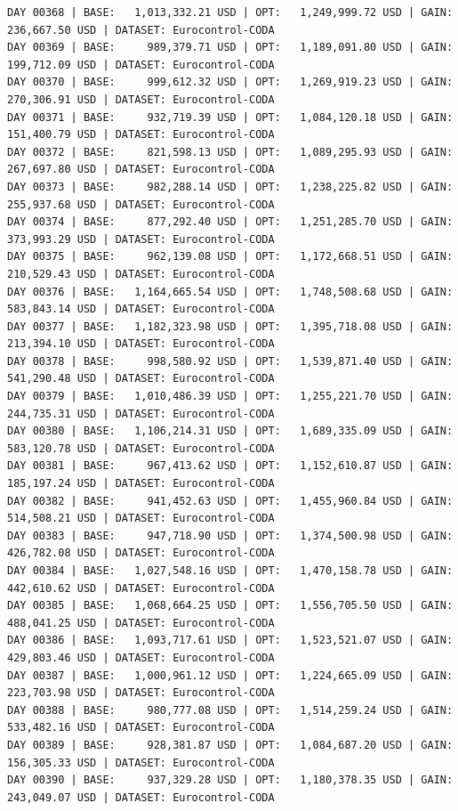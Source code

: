 \documentclass[11pt,a4paper]{article}
\begin{document}
\begin{verbatim}
DAY 00368 | BASE:   1,013,332.21 USD | OPT:   1,249,999.72 USD | GAIN: 236,667.50 USD | DATASET: Eurocontrol-CODA
DAY 00369 | BASE:     989,379.71 USD | OPT:   1,189,091.80 USD | GAIN: 199,712.09 USD | DATASET: Eurocontrol-CODA
DAY 00370 | BASE:     999,612.32 USD | OPT:   1,269,919.23 USD | GAIN: 270,306.91 USD | DATASET: Eurocontrol-CODA
DAY 00371 | BASE:     932,719.39 USD | OPT:   1,084,120.18 USD | GAIN: 151,400.79 USD | DATASET: Eurocontrol-CODA
DAY 00372 | BASE:     821,598.13 USD | OPT:   1,089,295.93 USD | GAIN: 267,697.80 USD | DATASET: Eurocontrol-CODA
DAY 00373 | BASE:     982,288.14 USD | OPT:   1,238,225.82 USD | GAIN: 255,937.68 USD | DATASET: Eurocontrol-CODA
DAY 00374 | BASE:     877,292.40 USD | OPT:   1,251,285.70 USD | GAIN: 373,993.29 USD | DATASET: Eurocontrol-CODA
DAY 00375 | BASE:     962,139.08 USD | OPT:   1,172,668.51 USD | GAIN: 210,529.43 USD | DATASET: Eurocontrol-CODA
DAY 00376 | BASE:   1,164,665.54 USD | OPT:   1,748,508.68 USD | GAIN: 583,843.14 USD | DATASET: Eurocontrol-CODA
DAY 00377 | BASE:   1,182,323.98 USD | OPT:   1,395,718.08 USD | GAIN: 213,394.10 USD | DATASET: Eurocontrol-CODA
DAY 00378 | BASE:     998,580.92 USD | OPT:   1,539,871.40 USD | GAIN: 541,290.48 USD | DATASET: Eurocontrol-CODA
DAY 00379 | BASE:   1,010,486.39 USD | OPT:   1,255,221.70 USD | GAIN: 244,735.31 USD | DATASET: Eurocontrol-CODA
DAY 00380 | BASE:   1,106,214.31 USD | OPT:   1,689,335.09 USD | GAIN: 583,120.78 USD | DATASET: Eurocontrol-CODA
DAY 00381 | BASE:     967,413.62 USD | OPT:   1,152,610.87 USD | GAIN: 185,197.24 USD | DATASET: Eurocontrol-CODA
DAY 00382 | BASE:     941,452.63 USD | OPT:   1,455,960.84 USD | GAIN: 514,508.21 USD | DATASET: Eurocontrol-CODA
DAY 00383 | BASE:     947,718.90 USD | OPT:   1,374,500.98 USD | GAIN: 426,782.08 USD | DATASET: Eurocontrol-CODA
DAY 00384 | BASE:   1,027,548.16 USD | OPT:   1,470,158.78 USD | GAIN: 442,610.62 USD | DATASET: Eurocontrol-CODA
DAY 00385 | BASE:   1,068,664.25 USD | OPT:   1,556,705.50 USD | GAIN: 488,041.25 USD | DATASET: Eurocontrol-CODA
DAY 00386 | BASE:   1,093,717.61 USD | OPT:   1,523,521.07 USD | GAIN: 429,803.46 USD | DATASET: Eurocontrol-CODA
DAY 00387 | BASE:   1,000,961.12 USD | OPT:   1,224,665.09 USD | GAIN: 223,703.98 USD | DATASET: Eurocontrol-CODA
DAY 00388 | BASE:     980,777.08 USD | OPT:   1,514,259.24 USD | GAIN: 533,482.16 USD | DATASET: Eurocontrol-CODA
DAY 00389 | BASE:     928,381.87 USD | OPT:   1,084,687.20 USD | GAIN: 156,305.33 USD | DATASET: Eurocontrol-CODA
DAY 00390 | BASE:     937,329.28 USD | OPT:   1,180,378.35 USD | GAIN: 243,049.07 USD | DATASET: Eurocontrol-CODA

\end{verbatim}
\end{document}
